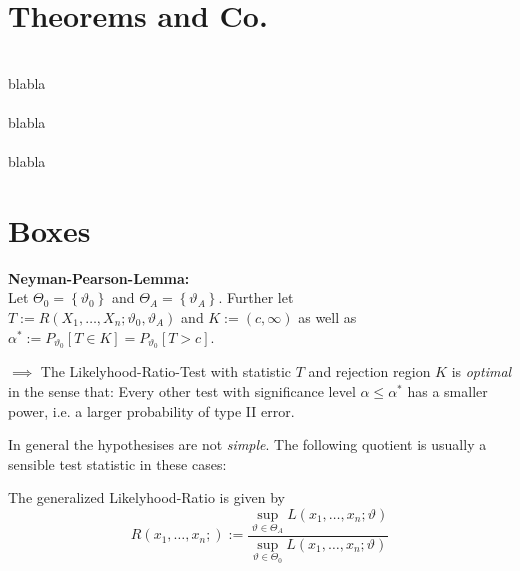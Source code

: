 \section{Theorems and Co.}

 \\
blabla \\

 \\
blabla \\

\Lemma[Independance] \\
blabla

\section{Boxes}

\begin{boxred}
\textbf{Neyman-Pearson-Lemma:} \\ Let 
$\Theta_{0}=\left\{\vartheta_{0}\right\}$ and $\Theta_{A}=\left\{\vartheta_{A}\right\}$. Further let \\
$T:=R\left(X_{1}, \ldots, X_{n} ; \vartheta_{0}, \vartheta_{A}\right)$ and $K:=(c, \infty)$ as well as $\alpha^{*}:=P_{\vartheta_{0}}[T \in K]=P_{\vartheta_{0}}[T>c]$.

$\implies$ The Likelyhood-Ratio-Test with statistic $T$ and rejection region $K$ is \textit{optimal} in the sense that: Every other test with significance level $\alpha \leq \alpha^{*}$ has a smaller power, i.e. a larger probability of type II error.
\end{boxred}


In general the hypothesises are not \textit{simple}. The following quotient is usually a sensible test statistic in these cases:
\begin{boxemerald}
The generalized Likelyhood-Ratio is given by
$$
R\left(x_{1}, \ldots, x_{n} ;\right):=\frac{\sup_{\vartheta \in \Theta_A} L\left(x_{1}, \ldots, x_{n} ; \vartheta\right)}{\sup_{\vartheta \in \Theta_0} L\left(x_{1}, \ldots, x_{n} ; \vartheta\right)}
$$
\end{boxemerald}


